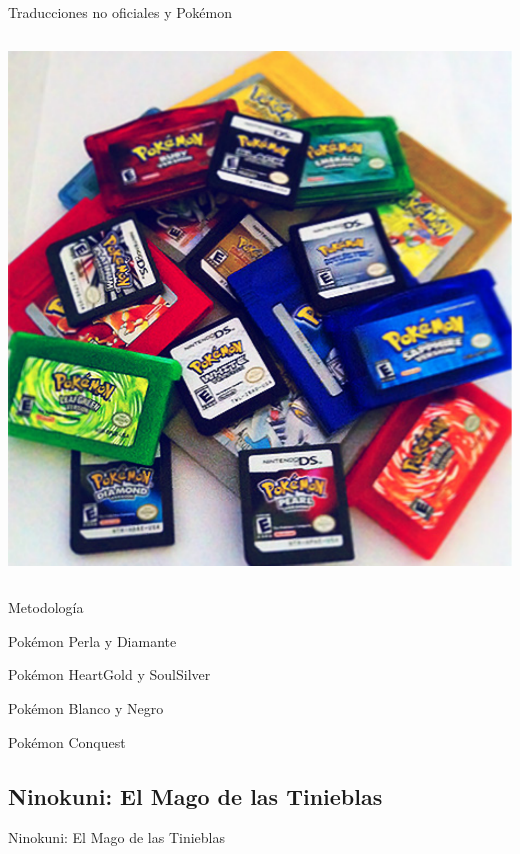 \begin{frame}{Traducciones no oficiales y Pokémon}
\begin{columns}
  \begin{column}{0.4\textwidth}
    \includegraphics[width=\textwidth]{imgs/pokemon_cart.pdf}
  \end{column}
\end{columns}

\end{frame}

\begin{frame}{Metodología}
\end{frame}

\begin{frame}{Pokémon Perla y Diamante}

\end{frame}

\begin{frame}{Pokémon HeartGold y SoulSilver}

\end{frame}

\begin{frame}{Pokémon Blanco y Negro}

\end{frame}

\begin{frame}{Pokémon Conquest}

\end{frame}

\subsection{Ninokuni: El Mago de las Tinieblas}
\begin{frame}{Ninokuni: El Mago de las Tinieblas}

\end{frame}

